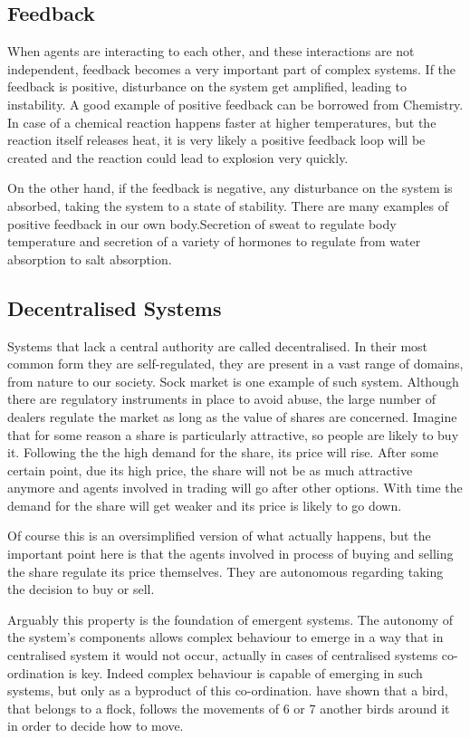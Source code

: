 \subsection{Feedback}
\label{subsec:feedback}

When agents are interacting to each other, and these interactions are not independent, feedback becomes a very important part of complex systems. If the feedback is positive, disturbance on the system get amplified, leading to instability. A good example of positive feedback can be borrowed from Chemistry. In case of a chemical reaction happens faster at higher temperatures, but the reaction itself releases heat, it is very likely a positive feedback loop will be created and the reaction could lead to explosion very quickly.

On the other hand, if the feedback is negative, any disturbance on the system is absorbed, taking the system to a state of stability. There are many examples of positive feedback in our own body.Secretion of sweat to regulate body temperature and secretion of a variety of hormones to regulate from water absorption to salt absorption.  

\subsection{Decentralised Systems}

Systems that lack a central authority are called decentralised. In their most common form they are self-regulated, they are present in a vast range of domains, from nature to our society. Sock market is one example of such system. Although there are regulatory instruments in place to avoid abuse, the large number of dealers regulate the market as long as the value of shares are concerned. Imagine that for some reason a share is particularly attractive, so people are likely to buy it. Following the the high demand for the share, its price will rise. After some certain point, due its high price, the share will not be as much attractive anymore and agents involved in trading will go after other options. With time the demand for the share will get weaker and its price is likely to go down.

Of course this is an oversimplified version of what actually happens, but the important point here is that the agents involved in process of buying and selling the share regulate its price themselves. They are autonomous regarding taking the decision to buy or sell.

Arguably this property is the foundation of emergent systems. The autonomy of the system's components allows complex behaviour to emerge in a way that in centralised system it would not occur, actually in cases of centralised systems co-ordination is key. Indeed complex behaviour is capable of emerging in such systems, but only as a byproduct of this co-ordination. \citeauthor{ballerini2008interaction} have shown that a bird, that belongs to a flock, follows the movements of 6 or 7 another birds around it in order to decide how to move.

